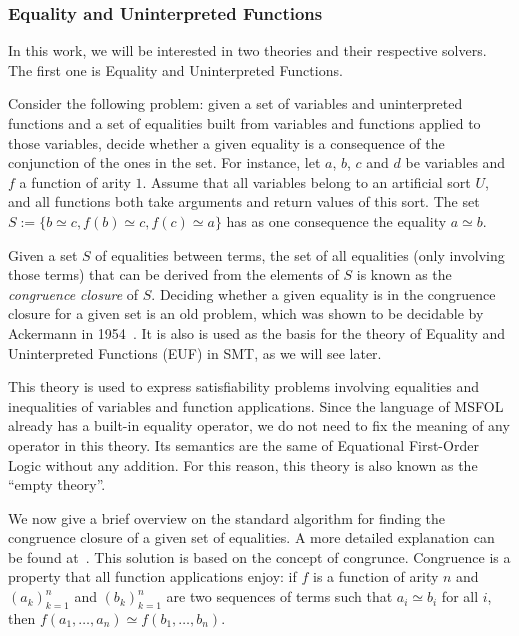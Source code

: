 \subsubsection{Equality and Uninterpreted Functions}\label{sec:euf}

In this work, we will be interested in two theories and their respective solvers. The first one is Equality and Uninterpreted Functions.

Consider the following problem: given a set of variables and uninterpreted functions and a set of equalities built from variables and functions applied to those variables, decide whether a given equality is a consequence of the conjunction of the ones in the set. For instance, let $a$, $b$, $c$ and $d$ be variables and $f$ a function of arity $1$. Assume that all variables belong to an artificial sort $U$, and all functions both take arguments and return values of this sort. The set $S := \{b \simeq c, f(b) \simeq c, f(c) \simeq a\}$ has as one consequence the equality $a \simeq b$.

Given a set $S$ of equalities between terms, the set of all equalities (only involving those terms) that can be
derived from the elements of $S$ is known as the \textit{congruence closure} of $S$.
%
Deciding whether a given equality is in the congruence closure for a given set is an old problem, which was shown to be decidable by Ackermann in 1954~\cite{ack_cong}. It is also is used as the basis for the theory of Equality and Uninterpreted Functions (EUF) in SMT, as we will see later.

This theory is used to express satisfiability problems involving equalities
and inequalities of variables and function applications. Since the language of
MSFOL already has a built-in equality operator, we do not need to fix the meaning
of any operator in this theory. Its semantics are the same of Equational First-Order
Logic without any addition. For this reason, this theory is also known as the
``empty theory''.

We now give a brief overview on the standard algorithm for finding the congruence closure of a given set of equalities. A more detailed explanation can be found at~\cite{orig_cong_clos}. This solution is based on the concept of congrunce.
Congruence is a property that all function applications enjoy:
if $f$ is a function of arity $n$ and ${(a_{k})}_{k = 1}^{n}$ and ${(b_{k})}_{k = 1}^{n}$ are two sequences of terms such that $a_{i} \simeq b_{i}$ for all $i$, then
$f(a_{1}, \ldots, a_{n}) \simeq f(b_{1}, \ldots, b_{n})$.

